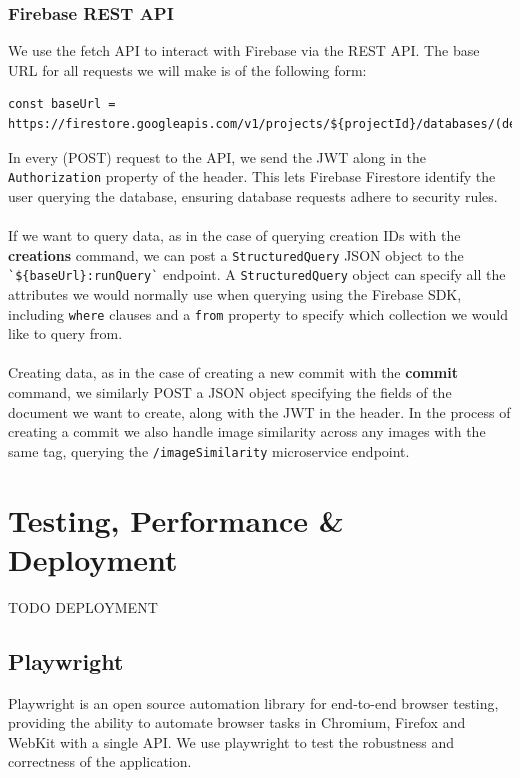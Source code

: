 \documentclass[12pt,a4paper]{article}
\begin{document}
\subsubsection{Firebase REST API}
We use the fetch API to interact with Firebase via the REST API. The base URL for all requests we will make is of the following form:
\begin{lstlisting}
const baseUrl = https://firestore.googleapis.com/v1/projects/${projectId}/databases/(default)/documents
\end{lstlisting}
In every (POST) request to the API, we send the JWT along in the \verb|Authorization| property of the header. This lets Firebase Firestore identify the user querying the database, ensuring database requests adhere to security rules.
\\\\
If we want to query data, as in the case of querying creation IDs with the \textbf{creations} command, we can post a \verb|StructuredQuery| JSON object to the \verb|`${baseUrl}:runQuery`| endpoint. A \verb|StructuredQuery| object can specify all the attributes we would normally use when querying using the Firebase SDK, including \verb|where| clauses and a \verb|from| property to specify which collection we would like to query from. 
\\\\
Creating data, as in the case of creating a new commit with the \textbf{commit} command, we similarly POST a JSON object specifying the fields of the document we want to create, along with the JWT in the header. In the process of creating a commit we also handle image similarity across any images with the same tag, querying the \verb|/imageSimilarity| microservice endpoint.
\section{Testing, Performance \& Deployment}
TODO DEPLOYMENT
\subsection{Playwright}
Playwright is an open source automation library for end-to-end browser testing, providing the ability to automate browser tasks in Chromium, Firefox and WebKit with a single API. We use playwright to test the robustness and correctness of the application.
\end{document}
